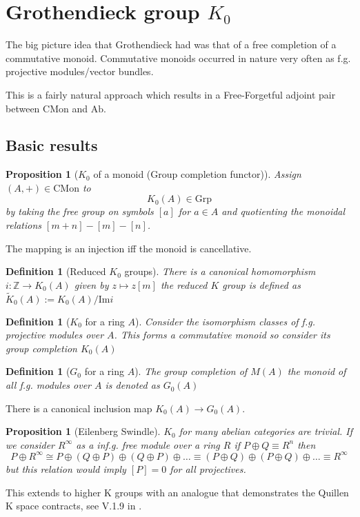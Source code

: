 \documentclass[12pt]{article}
\numberwithin{equation}{section}
\newcommand{\Z}{\mathbb{Z}}
\newcommand{\image}{{\mathrm{Im}}}
\newcounter{dummy} \numberwithin{dummy}{section}
\newtheorem{definition}[dummy]{Definition}
\newtheorem{proposition}[dummy]{Proposition}
\begin{document}
	
	\section{Grothendieck group $K_0$}
	The big picture idea that Grothendieck had was that of a free completion of a commutative monoid. Commutative monoids occurred in nature very often as f.g. projective modules/vector bundles. 
	
	This is a fairly natural approach which results in a Free-Forgetful adjoint pair between $\mathrm{CMon}$ and $\mathrm{Ab}$. 
	
	\subsection{Basic results}
		
	\begin{proposition}[$K_0$ of a monoid (Group completion functor)]
		Assign $(A,+) \in \mathrm{CMon} $ to \[K_0(A) \in \mathrm{Grp}\] by taking the free group on symbols $[a]$ for $a \in A$ and quotienting the monoidal relations $[m+n]-[m]-[n]$.
	\end{proposition}
	
	The mapping is an injection iff the monoid is cancellative.
	\begin{definition}[Reduced $K_0$ groups]
	There is a canonical homomorphism $i: \Z \to K_0(A)$ given by $z \mapsto z[m]$ the reduced $K$ group is defined as $\tilde{K}_0(A):=K_0(A)/\image i $
	\end{definition}
	
	
	\begin{definition}[$K_0$ for a ring $A$]
		Consider the isomorphism classes of f.g. projective modules over $A$. This forms a commutative monoid so consider its group completion $K_0(A)$
	\end{definition}
	\begin{definition}[$G_0$ for a ring $A$]
	The group completion of $M(A) $ the monoid of all f.g. modules over $A$ is denoted as $G_0(A)$
	\end{definition}
	There is a canonical inclusion map $K_0(A) \to G_0(A)$.

	\begin{proposition}[Eilenberg Swindle]
		$K_0$ for many abelian categories are trivial. If we consider $R^\infty$ as a inf.g. free module over a ring $R$ if $P \oplus Q \equiv R^n$ then \[ P \oplus R^\infty \cong P \oplus (Q \oplus P) \oplus (Q \oplus P) \oplus \dots \equiv (P \oplus Q) \oplus (P \oplus Q) \oplus \dots \equiv R^\infty \] but this relation would imply $[P]=0 $ for all projectives. 
	\end{proposition}
	This extends to higher K groups with an analogue that demonstrates the Quillen K space contracts, see V.1.9 in \cite{weibel2013k}.
	
\end{document}
